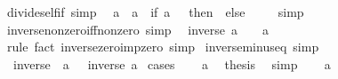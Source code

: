 \begin{isabellebody}
%
\isadelimproof
\isanewline
%
\endisadelimproof
\isanewline
{}\isamarkupfalse%
\ divide{\isacharunderscore}{\kern0pt}self{\isacharunderscore}{\kern0pt}if\ {\isacharbrackleft}{\kern0pt}simp{\isacharbrackright}{\kern0pt}{\isacharcolon}{\kern0pt}\isanewline
\ \ {\isachardoublequoteopen}a\ {\isacharslash}{\kern0pt}\ a\ {\isacharequal}{\kern0pt}\ {\isacharparenleft}{\kern0pt}if\ a\ {\isacharequal}{\kern0pt}\ {}\ then\ {}\ else\ {}{\isacharparenright}{\kern0pt}{\isachardoublequoteclose}\isanewline
%
\isadelimproof
\ \ %
\endisadelimproof
%
\isatagproof
{}\isamarkupfalse%
\ simp%
\endisatagproof
{\isafoldproof}%
%
\isadelimproof
\isanewline
%
\endisadelimproof
\isanewline
{}\isamarkupfalse%
\ inverse{\isacharunderscore}{\kern0pt}nonzero{\isacharunderscore}{\kern0pt}iff{\isacharunderscore}{\kern0pt}nonzero\ {\isacharbrackleft}{\kern0pt}simp{\isacharbrackright}{\kern0pt}{\isacharcolon}{\kern0pt}\isanewline
\ \ {\isachardoublequoteopen}inverse\ a\ {\isacharequal}{\kern0pt}\ {}\ {\isasymlongleftrightarrow}\ a\ {\isacharequal}{\kern0pt}\ {}{\isachardoublequoteclose}\isanewline
%
\isadelimproof
\ \ %
\endisadelimproof
%
\isatagproof
{}\isamarkupfalse%
\ rule\ {\isacharparenleft}{\kern0pt}fact\ inverse{\isacharunderscore}{\kern0pt}zero{\isacharunderscore}{\kern0pt}imp{\isacharunderscore}{\kern0pt}zero{\isacharcomma}{\kern0pt}\ simp{\isacharparenright}{\kern0pt}%
\endisatagproof
{\isafoldproof}%
%
\isadelimproof
\isanewline
%
\endisadelimproof
\isanewline
{}\isamarkupfalse%
\ inverse{\isacharunderscore}{\kern0pt}minus{\isacharunderscore}{\kern0pt}eq\ {\isacharbrackleft}{\kern0pt}simp{\isacharbrackright}{\kern0pt}{\isacharcolon}{\kern0pt}\isanewline
\ \ {\isachardoublequoteopen}inverse\ {\isacharparenleft}{\kern0pt}{\isacharminus}{\kern0pt}\ a{\isacharparenright}{\kern0pt}\ {\isacharequal}{\kern0pt}\ {\isacharminus}{\kern0pt}\ inverse\ a{\isachardoublequoteclose}\isanewline
%
\isadelimproof
%
\endisadelimproof
%
\isatagproof
{}\isamarkupfalse%
\ cases\isanewline
\ \ \isamarkupfalse%
\ {\isachardoublequoteopen}a{\isacharequal}{\kern0pt}{}{\isachardoublequoteclose}\ \isamarkupfalse%
\ {\isacharquery}{\kern0pt}thesis\ \isamarkupfalse%
\ simp\isanewline
{}\isamarkupfalse%
\isanewline
\ \ \isamarkupfalse%
\ {\isachardoublequoteopen}a{\isasymnoteq}{}{\isachardoublequoteclose}\isanewline
\ \ \isamarkupfalse%

\end{isabellebody}
